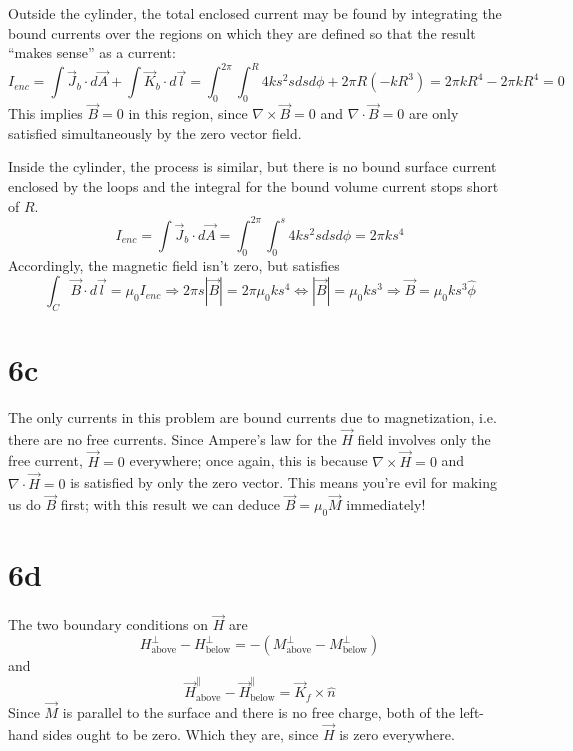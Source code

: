 \documentclass{article}
\begin{document}
Outside the cylinder, the total enclosed current may be found by integrating the bound currents over the regions on which they are defined so that the result ``makes sense'' as a current:
\[I_{enc}=\int\vec{J}_b\cdot d\vec{A}+\int\vec{K}_b\cdot d\vec{l}=\int_0^{2\pi}\int_0^R4ks^2sdsd\phi+2\pi R(-kR^3)=2\pi k R^4-2\pi kR^4=0\]
This implies $\vec{B}=0$ in this region, since $\nabla\times \vec{B}=0$ and $\nabla\cdot \vec{B}=0$ are only satisfied simultaneously by the zero vector field.

Inside the cylinder, the process is similar, but there is no bound surface current enclosed by the loops and the integral for the bound volume current stops short of $R$.
\[I_{enc}=\int\vec{J}_b\cdot d\vec{A}=\int_0^{2\pi}\int_0^s4ks^2sdsd\phi=2\pi k s^4\]
Accordingly, the magnetic field isn't zero, but satisfies
\[\int_C\vec{B}\cdot d\vec{l}=\mu_0I_{enc}\Rightarrow 2\pi s|\vec{B}|=2\pi \mu_0ks^4\Leftrightarrow |\vec{B}|={\mu_0ks^3}\Rightarrow\vec{B}=\mu_0ks^3\hat{\phi}\]

\section*{6c}
The only currents in this problem are bound currents due to magnetization, i.e. there are no free currents. Since Ampere's law for the $\vec{H}$ field involves only the free current, $\vec{H}=0$ everywhere; once again, this is because $\nabla\times \vec{H}=0$ and $\nabla\cdot \vec{H}=0$ is satisfied by only the zero vector. This means you're evil for making us do $\vec{B}$ first; with this result we can deduce $\vec{B}=\mu_0\vec{M}$ immediately!

\section*{6d}
The two boundary conditions on $\vec{H}$ are
\[H_{\textrm{above}}^\perp-H_{\textrm{below}}^\perp=-(M_{\textrm{above}}^\perp-M_{\textrm{below}}^\perp)\]
and
\[\vec{H}_{\textrm{above}}^\parallel-\vec{H}_{\textrm{below}}^\parallel=\vec{K}_f\times\hat{n}\]
Since $\vec{M}$ is parallel to the surface and there is no free charge, both of the left-hand sides ought to be zero. Which they are, since $\vec{H}$ is zero everywhere.
\end{document}
